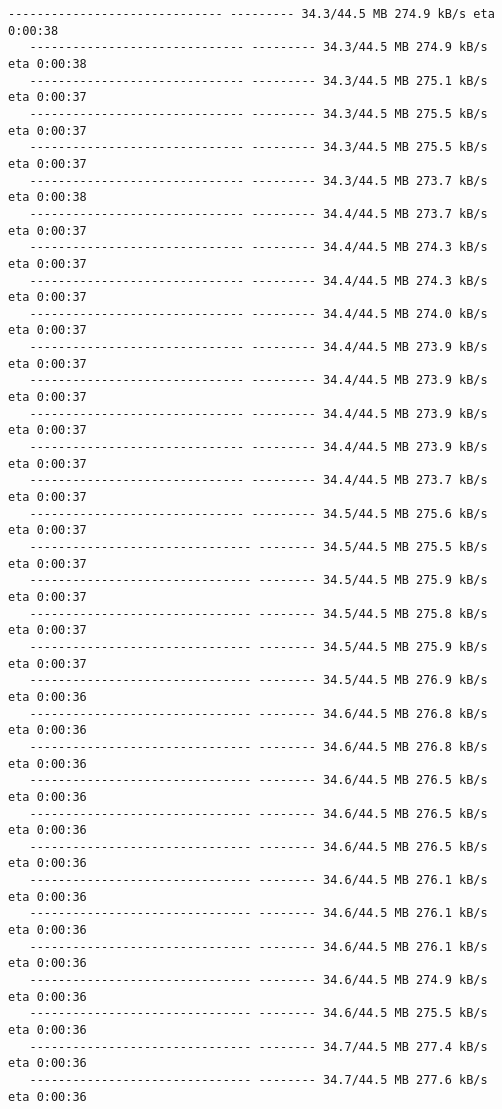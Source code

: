 \documentclass[11pt]{article}
\begin{document}
\begin{Verbatim}[commandchars=\\\{\}]
   ------------------------------ --------- 34.3/44.5 MB 274.9 kB/s eta 0:00:38
   ------------------------------ --------- 34.3/44.5 MB 274.9 kB/s eta 0:00:38
   ------------------------------ --------- 34.3/44.5 MB 275.1 kB/s eta 0:00:37
   ------------------------------ --------- 34.3/44.5 MB 275.5 kB/s eta 0:00:37
   ------------------------------ --------- 34.3/44.5 MB 275.5 kB/s eta 0:00:37
   ------------------------------ --------- 34.3/44.5 MB 273.7 kB/s eta 0:00:38
   ------------------------------ --------- 34.4/44.5 MB 273.7 kB/s eta 0:00:37
   ------------------------------ --------- 34.4/44.5 MB 274.3 kB/s eta 0:00:37
   ------------------------------ --------- 34.4/44.5 MB 274.3 kB/s eta 0:00:37
   ------------------------------ --------- 34.4/44.5 MB 274.0 kB/s eta 0:00:37
   ------------------------------ --------- 34.4/44.5 MB 273.9 kB/s eta 0:00:37
   ------------------------------ --------- 34.4/44.5 MB 273.9 kB/s eta 0:00:37
   ------------------------------ --------- 34.4/44.5 MB 273.9 kB/s eta 0:00:37
   ------------------------------ --------- 34.4/44.5 MB 273.9 kB/s eta 0:00:37
   ------------------------------ --------- 34.4/44.5 MB 273.7 kB/s eta 0:00:37
   ------------------------------ --------- 34.5/44.5 MB 275.6 kB/s eta 0:00:37
   ------------------------------- -------- 34.5/44.5 MB 275.5 kB/s eta 0:00:37
   ------------------------------- -------- 34.5/44.5 MB 275.9 kB/s eta 0:00:37
   ------------------------------- -------- 34.5/44.5 MB 275.8 kB/s eta 0:00:37
   ------------------------------- -------- 34.5/44.5 MB 275.9 kB/s eta 0:00:37
   ------------------------------- -------- 34.5/44.5 MB 276.9 kB/s eta 0:00:36
   ------------------------------- -------- 34.6/44.5 MB 276.8 kB/s eta 0:00:36
   ------------------------------- -------- 34.6/44.5 MB 276.8 kB/s eta 0:00:36
   ------------------------------- -------- 34.6/44.5 MB 276.5 kB/s eta 0:00:36
   ------------------------------- -------- 34.6/44.5 MB 276.5 kB/s eta 0:00:36
   ------------------------------- -------- 34.6/44.5 MB 276.5 kB/s eta 0:00:36
   ------------------------------- -------- 34.6/44.5 MB 276.1 kB/s eta 0:00:36
   ------------------------------- -------- 34.6/44.5 MB 276.1 kB/s eta 0:00:36
   ------------------------------- -------- 34.6/44.5 MB 276.1 kB/s eta 0:00:36
   ------------------------------- -------- 34.6/44.5 MB 274.9 kB/s eta 0:00:36
   ------------------------------- -------- 34.6/44.5 MB 275.5 kB/s eta 0:00:36
   ------------------------------- -------- 34.7/44.5 MB 277.4 kB/s eta 0:00:36
   ------------------------------- -------- 34.7/44.5 MB 277.6 kB/s eta 0:00:36

\end{Verbatim}
\end{document}
